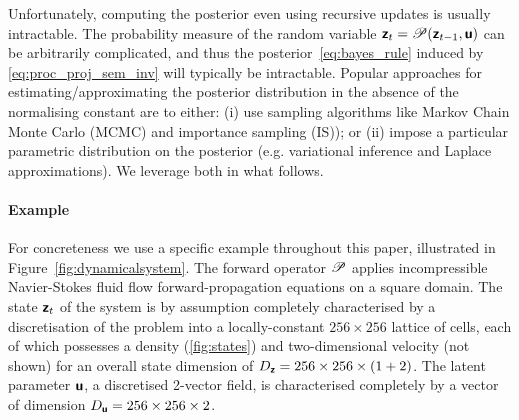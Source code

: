 \documentclass{article}
\theoremstyle{plain}
\theoremstyle{definition}
\theoremstyle{remark}
\begin{document}
Unfortunately, computing the posterior even using recursive updates is usually intractable.
The %
probability measure of the random variable $\boldsymbol{\mathsf{z}}_t = \mathscr{P}(\boldsymbol{\mathsf{z}}_{t-1}, \boldsymbol{\mathsf{u}})$  can be arbitrarily complicated, and thus the posterior~\eqref{eq:bayes_rule} induced by \eqref{eq:proc_proj_sem_inv} will typically be intractable.
Popular approaches for estimating/approximating the posterior distribution in the absence of the normalising constant are to either: (i) use sampling algorithms like Markov Chain Monte Carlo (MCMC) and importance sampling (IS)); or (ii) impose a particular parametric distribution on the posterior (e.g. variational inference and Laplace approximations).
We leverage both in what follows.

\paragraph{Example} For concreteness we use a specific example throughout this paper, illustrated in  Figure~\ref{fig:dynamicalsystem}.
The forward operator $\mathscr{P}$ applies incompressible Navier-Stokes fluid flow forward-propagation equations on a square domain.
The state $\boldsymbol{\mathsf{z}}_t$ of the system is by assumption completely characterised by a discretisation of the problem into a locally-constant \(256\times 256\) lattice of cells, each of which possesses a density (\ref{fig:states}) and two-dimensional velocity (not shown) for an overall state dimension of \(D_{\boldsymbol{\mathsf{z}}}=256\times 256 \times (1+2)\).
The latent parameter $\boldsymbol{\mathsf{u}}$, a discretised 2-vector field, is characterised completely by a vector of dimension \(D_{\boldsymbol{\mathsf{u}}}=256\times 256 \times 2\).

\end{document}

